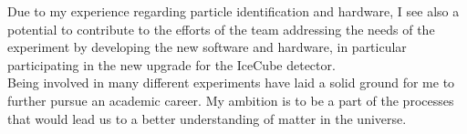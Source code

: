 \documentclass[a4paper,roman]{article}
\begin{document}


Due to my experience regarding particle identification and hardware, I see also a potential to contribute to the efforts of the team addressing the needs of the experiment by developing the new software and hardware, 
in particular participating in the new upgrade for the IceCube detector.
\\
Being involved in many different experiments have laid a solid ground for me to further pursue an academic career. My ambition is to be a part of the processes that would lead us to a better understanding of matter in the universe.
\end{document}
